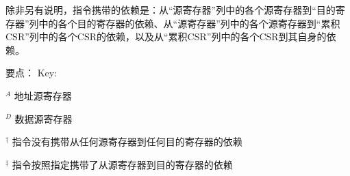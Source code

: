 除非另有说明，指令携带的依赖是：从“源寄存器”列中的各个源寄存器到“目的寄存器”列中的各个目的寄存器的依赖、从“源寄存器”列中的各个源寄存器到“累积CSR”列中的各个CSR的依赖，以及从“累积CSR”列中的各个CSR到其自身的依赖。

要点：
Key:

$^A$ 地址源寄存器 %

$^D$ 数据源寄存器 %

$^\dagger$ 指令没有携带从任何源寄存器到任何目的寄存器的依赖  %

$^\ddagger$ 指令按照指定携带了从源寄存器到目的寄存器的依赖 %

